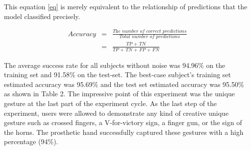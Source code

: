 

This equation \eqref{eq} is merely equivalent to the relationship of
predictions that the model classified precisely.

\begin{eqnarray}
  Accuracy & = & \frac{\textit{The number of correct predictions}}{\textit{Total number of predictions}} \\[1ex]
   & = & \frac{\textit{TP + TN}}{\textit{TP + TN + FP + FN}}
    \label{eq}
\end{eqnarray}


The average success rate for all subjects without noise was 94.96\% on
the training set and 91.58\% on the test-set. The best-case subject's
training set estimated accuracy was 95.69\% and the test set
estimated accuracy was 95.50\% as shown in Table 2. The impressive
point of this experiment was the unique gesture at the last part of
the experiment cycle.  As the last step of the experiment, users were
allowed to demonstrate any kind of creative unique gesture such as
crossed fingers, a V-for-victory sign, a finger gun, or the sign of
the horns.  The prosthetic hand successfully captured these gestures
with a high percentage (94\%).



